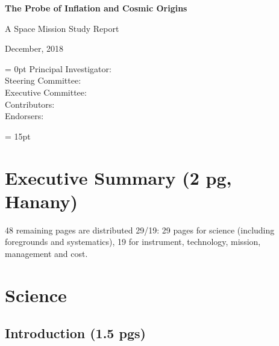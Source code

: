 \documentclass[12pt]{article}
\begin{document}


\setlength{\baselineskip}{0.96\baselineskip} %
\setlength{\parskip}{1.\parskip}



\setcounter{page}{0}
\setcounter{figure}{0}

\LARGE{ \centerline{\bf{The Probe of Inflation and Cosmic Origins}}}
\vspace{0.5in}
\Large{ \centerline{A Space Mission Study Report}}
\Large{ \centerline{December, 2018 }}
\vspace{0.5in}
\parindent = 0pt
\large{Principal Investigator:} \\
\large{Steering Committee:} \\
\large{Executive Committee:} \\
\large{Contributors:} \\
\large{Endorsers:} \\

\normalsize

\parindent = 15pt

\newpage

%


\section{Executive Summary (2 pg, Hanany)} 


\vspace{-0.05in}

48 remaining pages are distributed 29/19: 29 pages for science (including foregrounds and systematics), 
19 for instrument, technology, mission, management and cost.

\vspace{-0.18in}

\section{Science}

\vspace{-0.05in}

\subsection{Introduction (1.5 pgs)}

\vspace{-0.05in}
\end{document}

